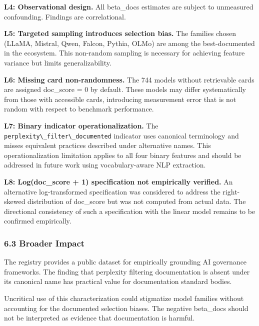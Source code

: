 \textbf{L4: Observational design.} All beta\_docs estimates are subject to unmeasured confounding. Findings are correlational.

\textbf{L5: Targeted sampling introduces selection bias.} The families chosen (LLaMA, Mistral, Qwen, Falcon, Pythia, OLMo) are among the best-documented in the ecosystem. This non-random sampling is necessary for achieving feature variance but limits generalizability.

\textbf{L6: Missing card non-randomness.} The 744 models without retrievable cards are assigned doc\_score = 0 by default. These models may differ systematically from those with accessible cards, introducing measurement error that is not random with respect to benchmark performance.

\textbf{L7: Binary indicator operationalization.} The \texttt{perplexity\textbackslash \_filter\textbackslash \_documented} indicator uses canonical terminology and misses equivalent practices described under alternative names. This operationalization limitation applies to all four binary features and should be addressed in future work using vocabulary-aware NLP extraction.

\textbf{L8: Log(doc\_score + 1) specification not empirically verified.} An alternative log-transformed specification was considered to address the right-skewed distribution of doc\_score but was not computed from actual data. The directional consistency of such a specification with the linear model remains to be confirmed empirically.

\subsubsection{6.3 Broader Impact}

The registry provides a public dataset for empirically grounding AI governance frameworks. The finding that perplexity filtering documentation is absent under its canonical name has practical value for documentation standard bodies.

Uncritical use of this characterization could stigmatize model families without accounting for the documented selection biases. The negative beta\_docs should not be interpreted as evidence that documentation is harmful.
